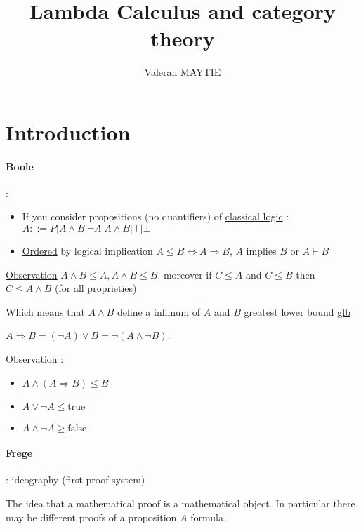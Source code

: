 \documentclass{article}
\title{Lambda Calculus and category theory}
\author{Valeran MAYTIE}
\date{}
\theoremstyle{plain}
\begin{document}
  \maketitle

  \tableofcontents

  \section{Introduction}

  \paragraph{Boole} :
    \begin{itemize}
      \item 
        If you consider propositions (no quantifiers) of
        \underline{classical logic} : $A ::= P | A \wedge B | \neg A | A \wedge B |
        \top | \bot $
      \item
        \underline{Ordered} by logical implication $A \leq B \Leftrightarrow A
        \Rightarrow B$, $A$ implies $B$ or $A \vdash B$
    \end{itemize}

    \underline{Observation} $A \wedge B \leq A, A \wedge B \leq B$. moreover if
    $C \leq A$ and $C \leq B$ then $C \leq A \wedge B$ (for all proprieties)

    Which means that $A \wedge B$ define a infimum of $A$ and $B$ greatest lower
    bound \underline{glb}

   $A \Rightarrow B = (\neg A) \vee B = \neg (A \wedge \neg B)$.

  \hspace{5mm}

  Observation : \begin{itemize}
    \item $A \wedge (A \Rightarrow B) \leq B$
    \item $A \vee \neg A \leq \text{true}$
    \item $A \wedge \neg A \geq \text{false}$
  \end{itemize}\paragraph{Frege} : ideography (first proof system)

  The idea that a mathematical proof is a mathematical object. In particular
  there may be different proofs of a proposition $A$ formula.
\end{document}
